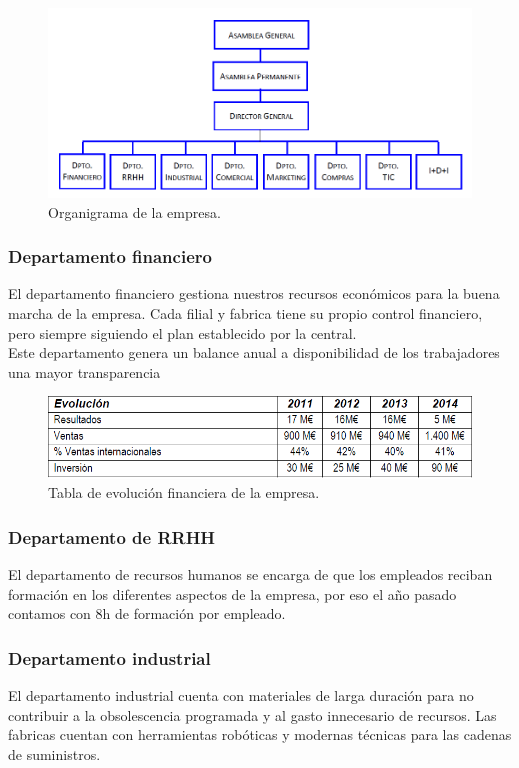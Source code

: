 \documentclass[a4paper]{article}
\begin{document}
\begin{figure}[ht!]
	\includegraphics[width=130mm]{Organization.png}
	\caption{Organigrama de la empresa.}
	\label{fig:organization}
\end{figure}

\subsubsection{Departamento financiero}
El departamento financiero gestiona nuestros recursos económicos para la buena marcha de la empresa. Cada filial y fabrica tiene su propio control financiero, pero siempre siguiendo el plan establecido por la central.\\
Este departamento genera un balance anual a disponibilidad de los trabajadores una mayor transparencia 

\begin{figure}[ht!]
	\includegraphics[width=130mm]{Finances.png}
	\caption{Tabla de evolución financiera de la empresa.}
	\label{fig:finances}
\end{figure}

\subsubsection{Departamento de RRHH}
El departamento de recursos humanos se encarga de que los empleados reciban formación en los diferentes aspectos de la empresa, por eso el año pasado contamos con 8h de formación por empleado.
\subsubsection{Departamento industrial}
El departamento industrial cuenta con materiales de larga duración para no contribuir a la obsolescencia programada y al gasto innecesario de recursos. Las fabricas cuentan con herramientas robóticas y modernas técnicas para las cadenas de suministros.
\end{document}
